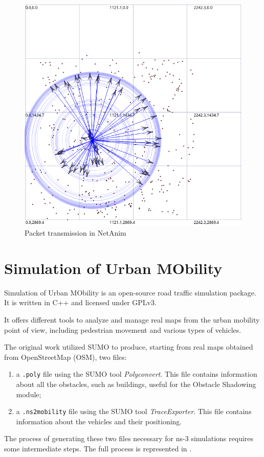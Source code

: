 	\begin{figure}[H]
		\centering
		\includegraphics[scale=0.38]{immagini/netanim}
		\caption{Packet transmission in NetAnim}
		\label{fig:netanim}
	\end{figure}
	
	\section{Simulation of Urban MObility}
	Simulation of Urban MObility is an open-source road traffic simulation package. It is written in C++ and licensed under GPLv3. 
	
	
	It offers different tools to analyze and manage real maps from the urban mobility point of view, including pedestrian movement and various types of vehicles.
	
	
	The original work \cite{ROM2017} utilized SUMO to produce, starting from real maps obtained from OpenStreetMap (OSM), two files:
	\begin{enumerate}
		\item a \texttt{.poly} file using the SUMO tool \textit{Polyconvert}. This file contains information about all the obstacles, such as buildings, useful for the Obstacle Shadowing module;
		\item a \texttt{.ns2mobility} file using the SUMO tool \textit{TraceExporter}. This file contains information about the vehicles and their positioning. 
	\end{enumerate}
	The process of generating these two files necessary for ns-3 simulations requires some intermediate steps. The full process is represented in . 
	
